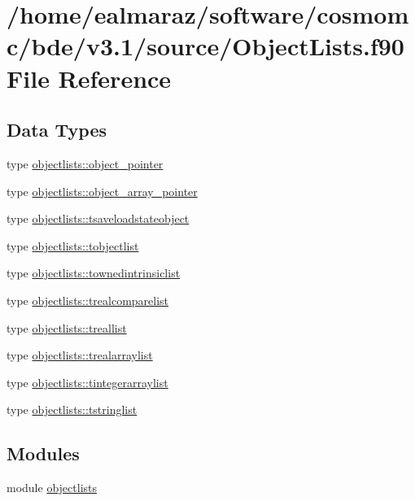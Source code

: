 \hypertarget{ObjectLists_8f90}{}\section{/home/ealmaraz/software/cosmomc/bde/v3.1/source/\+Object\+Lists.f90 File Reference}
\label{ObjectLists_8f90}
\subsection*{Data Types}
\begin{DoxyCompactItemize}
\item 
type \mbox{\hyperlink{structobjectlists_1_1object__pointer}{objectlists\+::object\+\_\+pointer}}
\item 
type \mbox{\hyperlink{structobjectlists_1_1object__array__pointer}{objectlists\+::object\+\_\+array\+\_\+pointer}}
\item 
type \mbox{\hyperlink{structobjectlists_1_1tsaveloadstateobject}{objectlists\+::tsaveloadstateobject}}
\item 
type \mbox{\hyperlink{structobjectlists_1_1tobjectlist}{objectlists\+::tobjectlist}}
\item 
type \mbox{\hyperlink{structobjectlists_1_1townedintrinsiclist}{objectlists\+::townedintrinsiclist}}
\item 
type \mbox{\hyperlink{structobjectlists_1_1trealcomparelist}{objectlists\+::trealcomparelist}}
\item 
type \mbox{\hyperlink{structobjectlists_1_1treallist}{objectlists\+::treallist}}
\item 
type \mbox{\hyperlink{structobjectlists_1_1trealarraylist}{objectlists\+::trealarraylist}}
\item 
type \mbox{\hyperlink{structobjectlists_1_1tintegerarraylist}{objectlists\+::tintegerarraylist}}
\item 
type \mbox{\hyperlink{structobjectlists_1_1tstringlist}{objectlists\+::tstringlist}}
\end{DoxyCompactItemize}
\subsection*{Modules}
\begin{DoxyCompactItemize}
\item 
module \mbox{\hyperlink{namespaceobjectlists}{objectlists}}
\end{DoxyCompactItemize}
